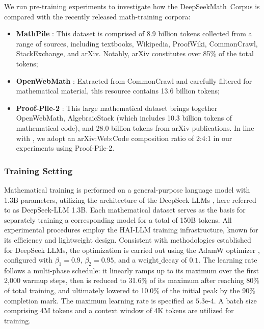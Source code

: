 \begin{itemize}[topsep=0pt]
We run pre-training experiments to investigate how the DeepSeekMath~Corpus is compared with the recently released math-training corpora:

\begin{itemize}[topsep=0pt]
    \item \textbf{MathPile} \citep{mathpile}: This dataset is comprised of 8.9 billion tokens collected from a range of sources, including textbooks, Wikipedia, ProofWiki, CommonCrawl, StackExchange, and arXiv. Notably, arXiv constitutes over 85\% of the total tokens;
    \item \textbf{OpenWebMath} \citep{openwebmath}: Extracted from CommonCrawl and carefully filtered for mathematical material, this resource contains 13.6 billion tokens;
    \item \textbf{Proof-Pile-2} \citep{llemma}: This large mathematical dataset brings together OpenWebMath, AlgebraicStack (which includes 10.3 billion tokens of mathematical code), and 28.0 billion tokens from arXiv publications. In line with \cite{llemma}, we adopt an arXiv:Web:Code composition ratio of 2:4:1 in our experiments using Proof-Pile-2.
\end{itemize}

\subsubsection{Training Setting}
\label{sec:quality-policy}
Mathematical training is performed on a general-purpose language model with 1.3B parameters, utilizing the architecture of the DeepSeek LLMs \citep{deepseek-llm}, here referred to as DeepSeek-LLM 1.3B. Each mathematical dataset serves as the basis for separately training a corresponding model for a total of 150B tokens. All experimental procedures employ the HAI-LLM \citep{haillm} training infrastructure, known for its efficiency and lightweight design. Consistent with methodologies established for DeepSeek LLMs, the optimization is carried out using the AdamW optimizer \citep{adamW}, configured with $\beta_1=0.9$, $\beta_2=0.95$, and a $\mathrm{weight\_decay}$ of $0.1$. The learning rate follows a multi-phase schedule: it linearly ramps up to its maximum over the first 2,000 warmup steps, then is reduced to 31.6\% of its maximum after reaching 80\% of total training, and ultimately lowered to 10.0\% of the initial peak by the 90\% completion mark. The maximum learning rate is specified as $5.3\text{e-}4$. A batch size comprising 4M tokens and a context window of 4K tokens are utilized for training.


\end{itemize}
